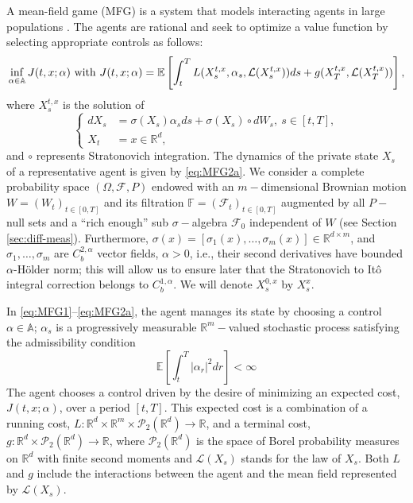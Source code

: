 \documentclass[12,english]{amsart}
\theoremstyle{plain}
\theoremstyle{definition}
\theoremstyle{plain}
\theoremstyle{plain}
\theoremstyle{remark}
\newcommand{\E}{\mathbb E}
\newcommand{\R}{\mathbb R}
\newcommand{\cL}{\mathcal L}
\newcommand{\cP}{\mathcal P}
\newcommand{\si}{\sigma}
\begin{document}
A mean-field game (MFG) is a system that models interacting agents
in large populations \cite{cardaliaguet2010notes}. The agents
are rational and seek to optimize a value function by selecting appropriate
controls as follows:
\begin{equation}
\inf_{\alpha\in\mathbb{A}}J(t,x;\alpha)\hbox{ with }J(t,x;\alpha)=\E\left[\int_t^TL(X^{t,x}_s,\alpha_s,\cL(X^{t,x}_s))ds+g(X^{t,x}_T,\cL(X^{t,x}_T))\right],\label{eq:MFG1}
\end{equation}
where $X^{t,x}_s$ is the solution of
\begin{equation}
\begin{cases}
dX_s&=\si(X_s)\alpha_sds+\si(X_s)\circ dW_s,\ s\in[t,T],\\
X_t&=x\in\R^d,
\end{cases}\label{eq:MFG2a}
\end{equation}
and $\circ$ represents Stratonovich integration.
The dynamics of the private state $X_s$ of a representative agent
is given by \eqref{eq:MFG2a}. We consider a complete probability space $\left(\Omega,\mathcal{F},P\right)$
endowed with an $m-$dimensional Brownian motion $W=\left(W_{t}\right)_{t\in[0,T]}$
and its filtration $\mathbb{F}=\left(\mathcal{F}_{t}\right)_{t\in\left[0,T\right]}$
augmented by all $P-$null sets and a ``rich enough'' sub $\sigma-$algebra
$\mathcal{F}_{0}$ independent of $W$ (see Section \ref{sec:diff-meas}). Furthermore, $\si(x)=\left[\si_1(x),\ldots,\si_m(x)\right]\in\R^{d\times m}$,
and $\si_1,\ldots,\si_m$
are $C^{2,\alpha}_b$ vector fields, $\alpha> 0$, i.e., their second
derivatives have bounded $\alpha$-H\"older norm;
this will allow us to ensure later that the Stratonovich to It\^o
integral correction belongs to $C^{1,\alpha}_b$. 
We will denote $X^{0,x}_s$ by $X^x_s$.

In \eqref{eq:MFG1}--\eqref{eq:MFG2a}, the agent manages its state
by choosing a control $\alpha\in\mathbb{A}$; $\alpha_s$ is a progressively
measurable $\R^m-$valued stochastic process satisfying
the admissibility condition 
\begin{equation}
\E\left[\int_t^T\left|\alpha_r\right|^2dr\right]<\infty\label{eq:sq_int}
\end{equation}
The agent chooses a control driven by the desire of minimizing an
expected cost, $J(t,x;\alpha)$, over a period $[t,T]$.
This expected cost is a combination of a running cost, $L:\R^d\times\R^m\times\cP_2(\R^d)\to\R$,
and a terminal cost, $g:\R^d\times\cP_2(\R^d)\to\R$, where
$\cP_2(\R^d)$ is the space of Borel probability
measures on $\R^d$ with finite second moments and $\cL(X_s)$
stands for the law of $X_s$. Both $L$ and $g$ include the interactions
between the agent and the mean field represented by $\cL(X_s)$.
\end{document}
